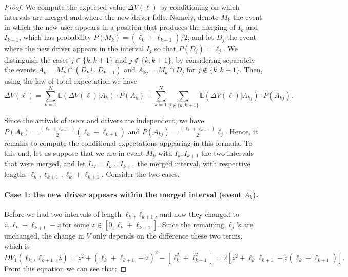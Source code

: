 \documentclass[12pt,english]{article}
\begin{document}
{\begin{proof}
We compute the expected value $\Delta V(\ell)$ by conditioning on which intervals are merged and where the new driver falls. Namely, denote $M_k$ the event in which the new user appears in a position that produces the merging of $I_k$ and $I_{k+1}$, which has probability $P(M_k)=(\ell_k+\ell_{k+1})/2$, and let  $D_j$ the event where the new driver appears in the interval $I_j$ so that $P(D_j)=\ell_j$. We distinguish the cases
$j\in\{k,k+1\}$ and $j\not\in \{k,k+1\}$, by considering separately the events $A_k=M_k\cap(D_k\cup D_{k+1})$ and $A_{kj}=M_k\cap D_j$ for  $j\not\in \{k,k+1\}$. 
Then, using the law of total expectation we have
\begin{equation} \label{eq:SummaryThm1}
    \Delta V(\ell) = \sum_{k=1}^N \mathbb{E}(\Delta V(\ell)|A_k) \cdot  P(A_k) + 
    \sum_{k=1}^N\sum_{j \notin \{k,k+1\}} \mathbb{E}(\Delta V(\ell)|A_{kj}) \cdot
    P(A_{kj}).
\end{equation}

Since the arrivals of users and drivers are independent, we have $P(A_k)=\frac{(\ell_k+\ell_{k+1})}{2}(\ell_k+\ell_{k+1})$ and $P(A_{kj})=\frac{(\ell_k+\ell_{k+1})}{2}\ell_j$.
Hence, it remains to compute the conditional expectations appearing in this formula. To this end, let us suppose that we are in event $M_k$ with $I_k,I_{k+1}$ the two intervals that were merged, and let $I_M=I_k \cup I_{k+1}$ the merged interval, with respective lengths  $\ell_k,\ell_{k+1},\ell_k+\ell_{k+1}$. Consider the two cases.

\paragraph{Case 1: the new driver appears within the merged interval (event $A_k$).} Before we had two intervals of length $\ell_k,\ell_{k+1}$, and now they changed to $z,\ell_k+\ell_{k+1}-z$ for some $z\in[0,\ell_k+\ell_{k+1}]$. Since the remaining $\ell_j$'s are unchanged, the change in $V$ only depends on the difference these two terms, which is
\begin{equation} \label{Eq:NewDriverInsideMergedInterval1}
 DV_1(\ell_k,\ell_{k+1},z)=   z^2 + (\ell_k+\ell_{k+1}-z)^2 - [\ell_k^2 + \ell_{k+1}^2] = 2[z^2+\ell_k\ell_{k+1}-z(\ell_k+\ell_{k+1})].
\end{equation}
From this equation  we can see that:


\end{proof}}
\end{document}
